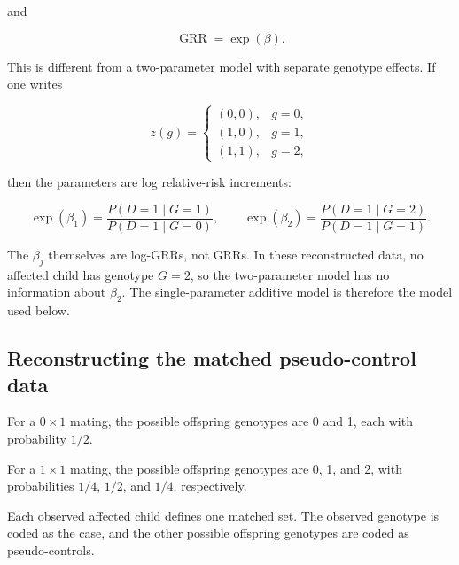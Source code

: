 \documentclass[
]{article}
\begin{document}
and

\[
\operatorname{GRR}=\exp(\beta).
\]

This is different from a two-parameter model with separate genotype
effects. If one writes

\[
z(g)=
\begin{cases}
(0,0), & g=0,\\
(1,0), & g=1,\\
(1,1), & g=2,
\end{cases}
\]

then the parameters are log relative-risk increments:

\[
\exp(\beta_1)
=
\frac{P(D=1\mid G=1)}{P(D=1\mid G=0)},
\qquad
\exp(\beta_2)
=
\frac{P(D=1\mid G=2)}{P(D=1\mid G=1)}.
\]

The \(\beta_j\) themselves are log-GRRs, not GRRs. In these
reconstructed data, no affected child has genotype \(G=2\), so the
two-parameter model has no information about \(\beta_2\). The
single-parameter additive model is therefore the model used below.

\subsection{Reconstructing the matched pseudo-control
data}\label{reconstructing-the-matched-pseudo-control-data}

For a \(0\times1\) mating, the possible offspring genotypes are 0 and 1,
each with probability \(1/2\).

For a \(1\times1\) mating, the possible offspring genotypes are 0, 1,
and 2, with probabilities \(1/4\), \(1/2\), and \(1/4\), respectively.

Each observed affected child defines one matched set. The observed
genotype is coded as the case, and the other possible offspring
genotypes are coded as pseudo-controls.
\end{document}
